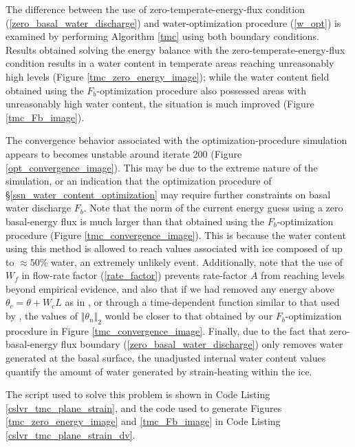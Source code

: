 The difference between the use of zero-temperate-energy-flux condition (\ref{zero_basal_water_discharge}) and water-optimization procedure (\ref{w_opt}) is examined by performing Algorithm \ref{tmc} using both boundary conditions.  Results obtained solving the energy balance with the zero-temperate-energy-flux condition results in a water content in temperate areas reaching unreasonably high levels (Figure \ref{tmc_zero_energy_image}); while the water content field obtained using the $F_b$-optimization procedure also possessed areas with unreasonably high water content, the situation is much improved (Figure \ref{tmc_Fb_image}).

The convergence behavior associated with the optimization-procedure simulation appears to becomes unstable around iterate 200 (Figure \ref{opt_convergence_image}).  This may be due to the extreme nature of the simulation, or an indication that the optimization procedure of \S \ref{ssn_water_content_optimization} may require further constraints on basal water discharge $F_b$.  Note that the norm of the current energy guess using a zero basal-energy flux is much larger than that obtained using the $F_b$-optimization procedure (Figure \ref{tmc_convergence_image}).  This is because the water content using this method is allowed to reach values associated with ice composed of up to $\approx 50$\% water, an extremely unlikely event.  Additionally, note that the use of $W_f$ in flow-rate factor (\ref{rate_factor}) prevents rate-factor $A$ from reaching levels beyond empirical evidence, and also that if we had removed any energy above $\theta_c = \theta + W_c L$ as in \citet{greve_2009}, or through a time-dependent function similar to that used by \citet{aschwanden_2012}, the values of $\Vert \theta_n \Vert_2$ would be closer to that obtained by our $F_b$-optimization procedure in Figure \ref{tmc_convergence_image}.  Finally, due to the fact that zero-basal-energy flux boundary (\ref{zero_basal_water_discharge}) only removes water generated at the basal surface, the unadjusted internal water content values quantify the amount of water generated by strain-heating within the ice.

The \CSLVR script used to solve this problem is shown in Code Listing \ref{cslvr_tmc_plane_strain}, and the code used to generate Figures \ref{tmc_zero_energy_image} and \ref{tmc_Fb_image} in Code Listing \ref{cslvr_tmc_plane_strain_dv}.

